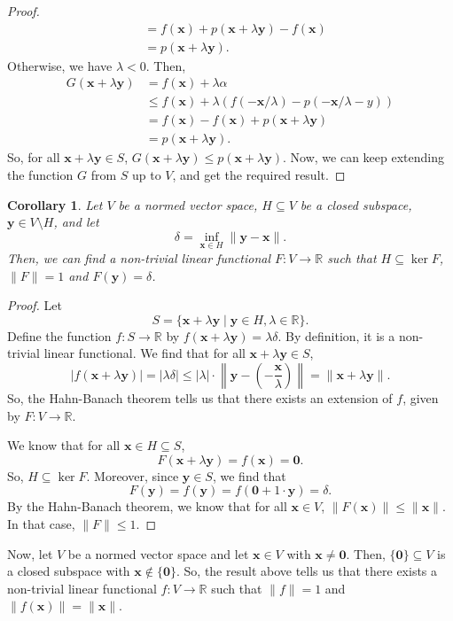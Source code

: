 \documentclass[a4paper, openany]{memoir}
\theoremstyle{definition}
\theoremstyle{plain}
\newtheorem{corollary}[definition]{Corollary}
\begin{document}
\begin{proof}
\begin{align*}
            &= f(\bm{x}) + p(\bm{x} + \lambda \bm{y}) - f(\bm{x}) \\
            &= p(\bm{x} + \lambda \bm{y}).
        \end{align*}
        Otherwise, we have $\lambda < 0$. Then,
        \begin{align*}
            G(\bm{x} + \lambda \bm{y}) &= f(\bm{x}) + \lambda \alpha \\
            &\leq f(\bm{x}) + \lambda (f(-\bm{x}/\lambda) - p(-\bm{x}/\lambda - y)) \\
            &= f(\bm{x}) - f(\bm{x}) + p(\bm{x} + \lambda \bm{y}) \\
            &= p(\bm{x} + \lambda \bm{y}).
        \end{align*}
        So, for all $\bm{x} + \lambda \bm{y} \in S$, $G(\bm{x} + \lambda \bm{y}) \leq p(\bm{x} + \lambda \bm{y})$. Now, we can keep extending the function $G$ from $S$ up to $V$, and get the required result.
    \end{proof}

    \begin{corollary}
        Let $V$ be a normed vector space, $H \subseteq V$ be a closed subspace, $\bm{y} \in V \setminus H$, and let 
        \[\delta = \inf_{\bm{x} \in H} \lVert \bm{y} - \bm{x} \rVert.\]
        Then, we can find a non-trivial linear functional $F: V \to \mathbb{R}$ such that $H \subseteq \ker F$, $\lVert F \rVert = 1$ and $F(\bm{y}) = \delta$.
    \end{corollary}
    \begin{proof}
        Let
        \[S = \{\bm{x} + \lambda \bm{y} \mid \bm{y} \in H, \lambda \in \mathbb{R}\}.\]
        Define the function $f: S \to \mathbb{R}$ by $f(\bm{x} + \lambda \bm{y}) = \lambda \delta$. By definition, it is a non-trivial linear functional. We find that for all $\bm{x} + \lambda \bm{y} \in S$,
        \[|f(\bm{x} + \lambda \bm{y})| = |\lambda \delta| \leq |\lambda| \cdot \left\lVert \bm{y} - \left(-\frac{\bm{x}}{\lambda}\right) \right\rVert = \lVert \bm{x} + \lambda \bm{y}\rVert.\]
        So, the Hahn-Banach theorem tells us that there exists an extension of $f$, given by $F: V \to \mathbb{R}$. 

        \noindent We know that for all $\bm{x} \in H \subseteq S$,
        \[F(\bm{x} + \lambda \bm{y}) = f(\bm{x}) = \bm{0}.\]
        So, $H \subseteq \ker F$. Moreover, since $\bm{y} \in S$, we find that
        \[F(\bm{y}) = f(\bm{y}) = f(\bm{0} + 1 \cdot \bm{y}) = \delta.\]
        By the Hahn-Banach theorem, we know that for all $\bm{x} \in V$, $\lVert F(\bm{x}) \rVert \leq \lVert \bm{x} \rVert$. In that case, $\lVert F \rVert \leq 1$. 
    \end{proof}
    \noindent Now, let $V$ be a normed vector space and let $\bm{x} \in V$ with $\bm{x} \neq \bm{0}$. Then, $\{\bm{0}\} \subseteq V$ is a closed subspace with $\bm{x} \not\in \{\bm{0}\}$. So, the result above tells us that there exists a non-trivial linear functional $f: V \to \mathbb{R}$ such that $\lVert f \rVert = 1$ and $\lVert f(\bm{x}) \rVert = \lVert \bm{x} \rVert$.
\end{document}
